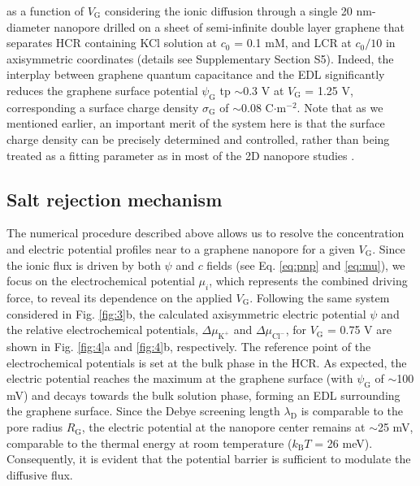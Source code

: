 \documentclass[journal=langd5,email=true, hyperref=true, keywords=false]{achemso}
\newcommand{\Fig}{Fig.}
\begin{document}
as a function of $V_{\mathrm{G}}$ considering the ionic diffusion
through a single 20 nm-diameter nanopore drilled on a sheet of
semi-infinite double layer graphene that separates HCR containing KCl
solution at $c_{0}$ = 0.1 mM, and LCR at $c_{0}/10$ in axisymmetric
coordinates (details see Supplementary Section S5). Indeed, the
interplay between graphene quantum capacitance and the EDL
significantly reduces the graphene surface potential
$\psi_{\mathrm{G}}$ tp $\sim$0.3 V at $V_{\mathrm{G}}$ = 1.25 V,
corresponding a surface charge density $\sigma_{\mathrm{G}}$ of
$\sim$0.08 C$\cdot$m$^{-2}$. Note that as we mentioned earlier, an
important merit of the system here is that the surface charge density
can be precisely determined and controlled, rather than being treated
as a fitting parameter as in most of the 2D nanopore studies
\cite{Rollings_2016}.

\subsection{Salt rejection mechanism}
\label{sec:mechanism}
The numerical procedure described above allows us to resolve the
concentration and electric potential profiles near to a graphene
nanopore for a given $V_{\mathrm{G}}$. Since the ionic flux is driven
by both $\psi$ and $c$ fields (see Eq. \eqref{eq:pnp} and \eqref{eq:mu}),
we focus on the electrochemical potential $\mu_{i}$, which represents
the combined driving force, to reveal its dependence on the applied
$V_{\mathrm{G}}$. Following the same system considered in \Fig{}
\ref{fig:3}b, the calculated axisymmetric electric potential $\psi$
and the relative electrochemical potentials,
$\Delta \mu_{\mathrm{K^{+}}}$ and $\Delta \mu_{\mathrm{Cl^{-}}}$, for
$V_{\mathrm{G}}$ = 0.75 V are shown in \Fig{} \ref{fig:4}a and
\ref{fig:4}b, respectively. The reference point of the electrochemical
potentials is set at the bulk phase in the HCR. As expected, the
electric potential reaches the maximum at the graphene surface (with
$\psi_{\mathrm{G}}$ of $\sim$100 mV) and decays towards the bulk
solution phase, forming an EDL surrounding the graphene surface. Since
the Debye screening length $\lambda_{\mathrm{D}}$ is comparable to the
pore radius $R_{\mathrm{G}}$, the electric potential at the nanopore
center remains at $\sim$25 mV, comparable to the thermal energy at
room temperature ($k_{\mathrm{B}}T$ = 26 meV). Consequently, it is
evident that the potential barrier is sufficient to modulate the
diffusive flux.
\end{document}
